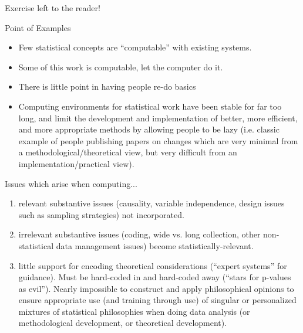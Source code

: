 \documentclass{beamer}
\begin{document}
\begin{frame}{Exercise left to the reader!}

\end{frame}

\begin{frame}{Point of Examples}
  \begin{itemize}
  \item Few statistical concepts are ``computable'' with existing systems.

  \item Some of this work is computable, let the computer do it.

  \item There is little point in having people re-do basics

  \item Computing environments for statistical work have been stable
    for far too long, and limit the development and implementation of
    better, more efficient, and more appropriate methods by allowing
    people to be lazy (i.e. classic example of people publishing
    papers on changes which are very minimal from a
    methodological/theoretical view, but very difficult from an
    implementation/practical view).
  \end{itemize}
\end{frame}

\begin{frame}{Issues which arise when computing...}
  \begin{enumerate}
  \item relevant substantive issues (causality, variable independence,
    design issues such as sampling strategies) not incorporated.
  \item irrelevant substantive issues (coding, wide vs. long
    collection, other non-statistical data management issues) become
    statistically-relevant.
  \item little support for encoding theoretical considerations (``expert
    systems'' for guidance).  Must be hard-coded in and hard-coded
    away (``stars for p-values as evil'').   Nearly impossible to
    construct and apply philosophical opinions to ensure appropriate
    use (and training through use) of singular or personalized
    mixtures of statistical philosophies when doing data analysis (or
    methodological development, or theoretical development).
  \end{enumerate}
\end{frame}
\end{document}
